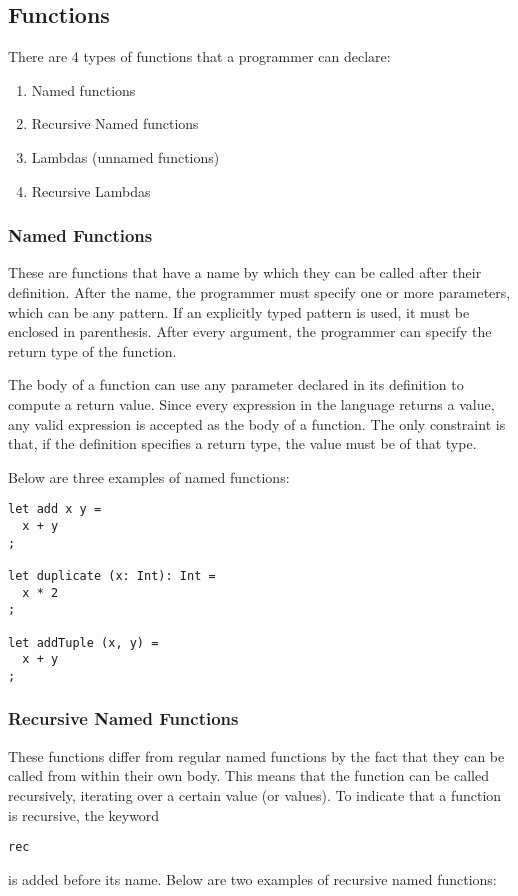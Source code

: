 \documentclass{article}
\def\code#1{\begin{footnotesize}\texttt{#1}\end{footnotesize}}
\begin{document}
\subsection{Functions}

There are 4 types of functions that a programmer can declare:

\begin{enumerate}
  \item Named functions
  \item Recursive Named functions
  \item Lambdas (unnamed functions)
  \item Recursive Lambdas
\end{enumerate}

\subsubsection{Named Functions}

These are functions that have a name by which they can be called after their definition.
After the name, the programmer must specify one or more parameters, which can be any pattern.
If an explicitly typed pattern is used, it must be enclosed in parenthesis.
After every argument, the programmer can specify the return type of the function.

The body of a function can use any parameter declared in its definition to compute a return value.
Since every expression in the language returns a value, any valid expression is accepted as the body of a function.
The only constraint is that, if the definition specifies a return type, the value must be of that type.

Below are three examples of named functions:

\begin{lstlisting}
let add x y =
  x + y
;

let duplicate (x: Int): Int =
  x * 2
;

let addTuple (x, y) =
  x + y
;
\end{lstlisting}

\subsubsection{Recursive Named Functions}

These functions differ from regular named functions by the fact that they can be called from within their own body.
This means that the function can be called recursively, iterating over a certain value (or values).
To indicate that a function is recursive, the keyword \code{rec} is added before its name.
Below are two examples of recursive named functions:
\end{document}
